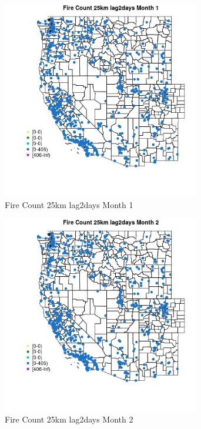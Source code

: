 \begin{figure} 
\centering  
\includegraphics[width=0.77\textwidth]{Code_Outputs/Report_ML_input_PM25_Step4_part_f_de_duplicated_aveswNAs_MapObsMo1Fire_Count_25km_lag2days.jpg} 
\caption{\label{fig:Report_ML_input_PM25_Step4_part_f_de_duplicated_aveswNAsMapObsMo1Fire_Count_25km_lag2days}Fire Count 25km lag2days Month 1} 
\end{figure} 
 

\clearpage 

\begin{figure} 
\centering  
\includegraphics[width=0.77\textwidth]{Code_Outputs/Report_ML_input_PM25_Step4_part_f_de_duplicated_aveswNAs_MapObsMo2Fire_Count_25km_lag2days.jpg} 
\caption{\label{fig:Report_ML_input_PM25_Step4_part_f_de_duplicated_aveswNAsMapObsMo2Fire_Count_25km_lag2days}Fire Count 25km lag2days Month 2} 
\end{figure} 
 

